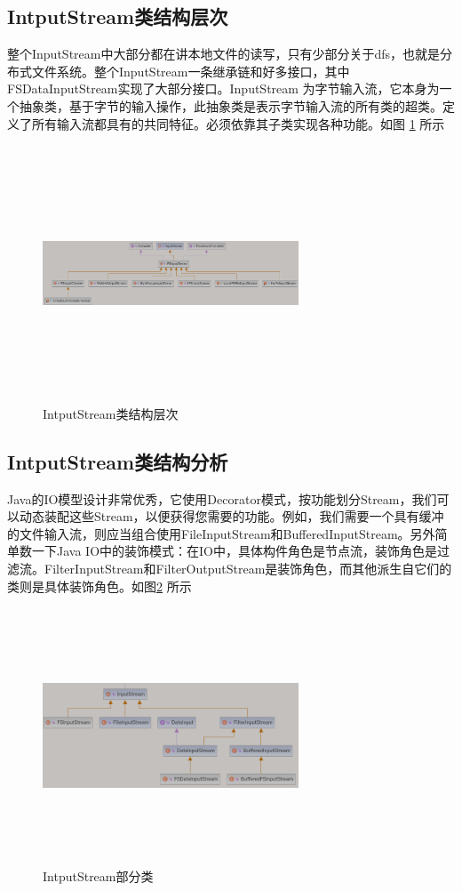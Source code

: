 	\subsection{IntputStream类结构层次} 
	整个InputStream中大部分都在讲本地文件的读写，只有少部分关于dfs，也就是分布式文件系统。整个InputStream一条继承链和好多接口，其中FSDataInputStream实现了大部分接口。InputStream 为字节输入流，它本身为一个抽象类，基于字节的输入操作，此抽象类是表示字节输入流的所有类的超类。定义了所有输入流都具有的共同特征。必须依靠其子类实现各种功能。如图 \ref{fig:graph1} 所示
	
	\begin{figure}
		\centering
	    \includegraphics[width=3in,height=3in]{UML/inputstream/hdfs-common-inputstream-diagram.png}
		\caption{IntputStream类结构层次}
		\label{fig:graph1}
	\end{figure}
	
	\subsection{IntputStream类结构分析} 
	Java的IO模型设计非常优秀，它使用Decorator模式，按功能划分Stream，我们可以动态装配这些Stream，以便获得您需要的功能。例如，我们需要一个具有缓冲的文件输入流，则应当组合使用FileInputStream和BufferedInputStream。另外简单数一下Java IO中的装饰模式：在IO中，具体构件角色是节点流，装饰角色是过滤流。FilterInputStream和FilterOutputStream是装饰角色，而其他派生自它们的类则是具体装饰角色。如图\ref{fig:graph2} 所示
	
	\begin{figure}
		\centering
		\includegraphics[width=3in,height=3in]{UML/inputstream/common-io-diagram.png}
		\caption{IntputStream部分类}
		\label{fig:graph2}
	\end{figure}
	
